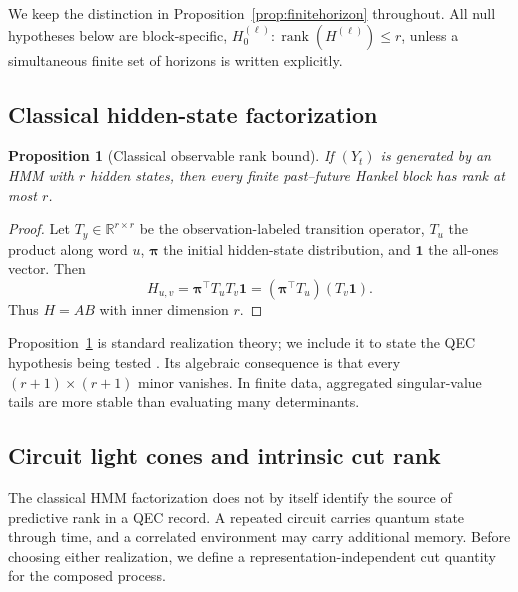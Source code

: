 \documentclass[11pt]{article}
\newtheorem{proposition}[theorem]{Proposition}
\newcommand{\rank}{\operatorname{rank}}
\begin{document}
We keep the distinction in Proposition~\ref{prop:finitehorizon} throughout. All null hypotheses below are block-specific, $H_{0}^{(\ell)}:\rank(H^{(\ell)})\le r$, unless a simultaneous finite set of horizons is written explicitly.

\subsection{Classical hidden-state factorization}

\begin{proposition}[Classical observable rank bound]
\label{prop:hmmrank}
If $(Y_t)$ is generated by an HMM with $r$ hidden states, then every finite past--future Hankel block has rank at most $r$.
\end{proposition}

\begin{proof}
Let $T_y\in\mathbb{R}^{r\times r}$ be the observation-labeled transition operator, $T_u$ the product along word $u$, $\bm\pi$ the initial hidden-state distribution, and $\bm 1$ the all-ones vector. Then
\[
    H_{u,v}=\bm\pi^\top T_uT_v\bm 1
           =(\bm\pi^\top T_u)(T_v\bm 1).
\]
Thus $H=AB$ with inner dimension $r$.
\end{proof}

Proposition~\ref{prop:hmmrank} is standard realization theory; we include it to state the QEC hypothesis being tested \cite{hsu2012spectral,huang2016minimal}. Its algebraic consequence is that every $(r+1)\times(r+1)$ minor vanishes. In finite data, aggregated singular-value tails are more stable than evaluating many determinants.

\subsection{Circuit light cones and intrinsic cut rank}
\label{sec:memorywitness}

The classical HMM factorization does not by itself identify the source of predictive rank in a QEC record. A repeated circuit carries quantum state through time, and a correlated environment may carry additional memory. Before choosing either realization, we define a representation-independent cut quantity for the composed process.
\end{document}
